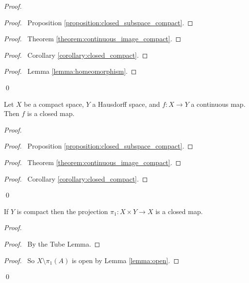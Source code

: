 \begin{proof}
    \pf
    \begin{proof}
        \pf\ Proposition \ref{proposition:closed_subspace_compact}.
    \end{proof}
    \begin{proof}
        \pf\ Theorem \ref{theorem:continuous_image_compact}.
    \end{proof}
    \begin{proof}
        \pf\ Corollary \ref{corollary:closed_compact}.
    \end{proof}
    \qedstep
    \begin{proof}
        \pf\ Lemma \ref{lemma:homeomorphism}.
    \end{proof}
    \qed
\end{proof}

\begin{proposition}
    \label{proposition:closed_map_compact_Hausdorff}
    Let $X$ be a compact space, $Y$ a Hausdorff space, and $f : X \rightarrow Y$
    a continuous map. Then $f$ is a closed map.
\end{proposition}

\begin{proof}
    \pf
    \begin{proof}
        \pf\ Proposition \ref{proposition:closed_subspace_compact}.
    \end{proof}
    \begin{proof}
        \pf\ Theorem \ref{theorem:continuous_image_compact}.
    \end{proof}
    \begin{proof}
        \pf\ Corollary \ref{corollary:closed_compact}.
    \end{proof}
    \qed
\end{proof}

\begin{proposition}
    \label{proposition:closed_map_compact_projection}
    If $Y$ is compact then the projection $\pi_1 : X \times Y \rightarrow X$
    is a closed map.
\end{proposition}

\begin{proof}
    \pf
    \begin{proof}
        \pf\ By the Tube Lemma.
    \end{proof}
    \qedstep
    \begin{proof}
        \pf\ So $X \setminus \pi_1(A)$ is open by Lemma \ref{lemma:open}.
    \end{proof}
    \qed
\end{proof}

